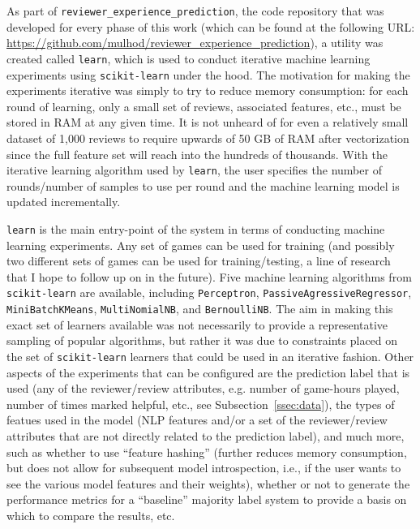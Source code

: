 \documentclass[9pt]{article}
\begin{document}
As part of {\tt reviewer\_experience\_prediction}, the code repository that was developed for every phase of this work (which can be found at the following URL: \url{https://github.com/mulhod/reviewer_experience_prediction}), a utility was created called {\tt learn}, which is used to conduct iterative machine learning experiments using {\tt scikit-learn} under the hood. The motivation for making the experiments iterative was simply to try to reduce memory consumption: for each round of learning, only a small set of reviews, associated features, etc., must be stored in RAM at any given time. It is not unheard of for even a relatively small dataset of 1,000 reviews to require upwards of 50 GB of RAM after vectorization since the full feature set will reach into the hundreds of thousands. With the iterative learning algorithm used by {\tt learn}, the user specifies the number of rounds/number of samples to use per round and the machine learning model is updated incrementally.

{\tt learn} is the main entry-point of the system in terms of conducting machine learning experiments. Any set of games can be used for training (and possibly two different sets of games can be used for training/testing, a line of research that I hope to follow up on in the future). Five machine learning algorithms from {\tt scikit-learn} are available, including {\tt Perceptron}, { \tt PassiveAgressiveRegressor}, {\tt MiniBatchKMeans}, {\tt MultiNomialNB}, and {\tt BernoulliNB}. The aim in making this exact set of learners available was not necessarily to provide a representative sampling of popular algorithms, but rather it was due to constraints placed on the set of {\tt scikit-learn} learners that could be used in an iterative fashion. Other aspects of the experiments that can be configured are the prediction label that is used (any of the reviewer/review attributes, e.g. number of game-hours played, number of times marked helpful, etc., see Subsection~\ref{ssec:data}), the types of featues used in the model (NLP features and/or a set of the reviewer/review attributes that are not directly related to the prediction label), and much more, such as whether to use ``feature hashing'' (further reduces memory consumption, but does not allow for subsequent model introspection, i.e., if the user wants to see the various model features and their weights), whether or not to generate the performance metrics for a ``baseline'' majority label system to provide a basis on which to compare the results, etc.
\end{document}
